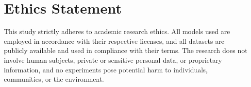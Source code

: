 \section*{Ethics Statement}
This study strictly adheres to academic research ethics. All models used are employed in accordance with their respective licenses, and all datasets are publicly available and used in compliance with their terms. The research does not involve human subjects, private or sensitive personal data, or proprietary information, and no experiments pose potential harm to individuals, communities, or the environment.